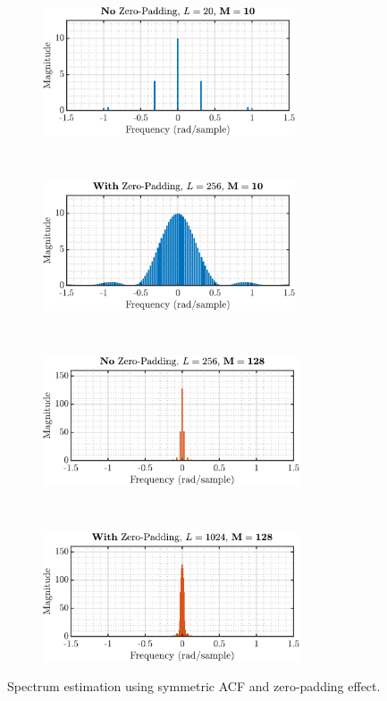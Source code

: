 \begin{enumerate}[label=\alph*), leftmargin=*]
\begin{figure}[h]
    \centering
    \begin{subfigure}{0.49\textwidth}
        \centering
        \includegraphics[height=1.5in]{report/spectrum-estimation/properties-of-power-spectral-density/assets/a/zero-pad-L_20-M_10}
    \end{subfigure}
    ~ 
    \begin{subfigure}{0.49\textwidth}
        \centering
        \includegraphics[height=1.5in]{report/spectrum-estimation/properties-of-power-spectral-density/assets/a/zero-pad-L_256-M_10}
    \end{subfigure}
    ~
    ~
    \begin{subfigure}{0.49\textwidth}
        \centering
        \includegraphics[height=1.5in]{report/spectrum-estimation/properties-of-power-spectral-density/assets/a/zero-pad-L_256-M_128}
    \end{subfigure}
    ~
    \begin{subfigure}{0.49\textwidth}
        \centering
        \includegraphics[height=1.5in]{report/spectrum-estimation/properties-of-power-spectral-density/assets/a/zero-pad-L_1024-M_128}
    \end{subfigure}
    \caption{Spectrum estimation using symmetric ACF and zero-padding effect.}
    \label{fig:1_2_a}
\end{figure}


\end{enumerate}
